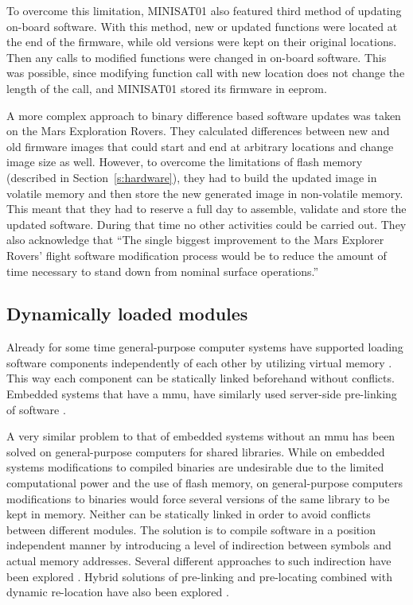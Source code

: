 To overcome this limitation, MINISAT01 also featured third method of updating on-board software. With this method, new or updated functions were located at the end of the firmware, while old versions were kept on their original locations. Then any calls to modified functions were changed in on-board software. This was possible, since modifying function call with new location does not change the length of the call, and MINISAT01 stored its firmware in \gls{eeprom}. \cite{Garrido1998}

A more complex approach to binary difference based software updates was taken on the Mars Exploration Rovers. They calculated differences between new and old firmware images that could start and end at arbitrary locations and change image size as well. However, to overcome the limitations of flash memory (described in Section~\ref{s:hardware}), they had to build the updated image in volatile memory and then store the new generated image in non-volatile memory. This meant that they had to reserve a full day to assemble, validate and store the updated software. During that time no other activities could be carried out. They also acknowledge that ``The single biggest improvement to the Mars Explorer Rovers' flight software modification process would be to reduce the amount of time necessary to stand down from nominal surface operations.'' \cite{Greco2005}

\subsection{Dynamically loaded modules}

Already for some time general-purpose computer systems have supported loading software components independently of each other by utilizing virtual memory \cite{Kilburn1962}. This way each component can be statically linked beforehand without conflicts. Embedded systems that have a \gls{mmu}, have similarly used server-side pre-linking of software \cite{Shen2010}.

A very similar problem to that of embedded systems without an \gls{mmu} has been solved on general-purpose computers for shared libraries. While on embedded systems modifications to compiled binaries are undesirable due to the limited computational power and the use of flash memory, on general-purpose computers modifications to binaries would force several versions of the same library to be kept in memory. Neither can be statically linked in order to avoid conflicts between different modules. The solution is to compile software in a position independent manner by introducing a level of indirection between symbols and actual memory addresses. Several different approaches to such indirection have been explored \cite[Chapter~8]{Levine1999}. Hybrid solutions of pre-linking and pre-locating combined with dynamic re-location have also been explored \cite{Dong2009}.

